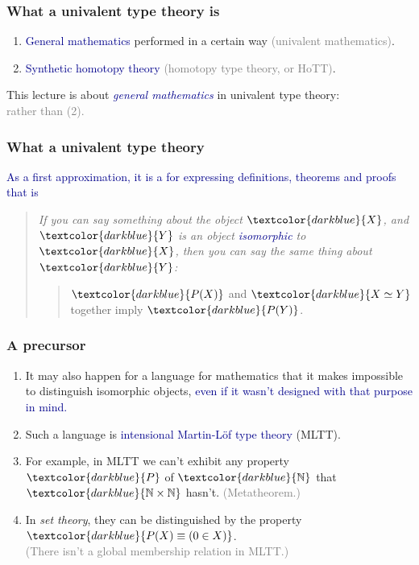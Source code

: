 \documentclass[aspectratio=169]{beamer}
\newcommand{\eqq}{\equiv}
\newcommand{\db}{\textcolor{darkblue}}
\newcommand{\dg}{\textcolor{darkgreen}}
\newcommand{\grey}{\textcolor{grey}}
\newcommand{\m}[1]{$\db{#1}$}
\newcommand{\N}{\mathbb{N}}
\begin{document}
\begin{frame}
  \frametitle{What a univalent type theory is }

  \begin{enumerate}
  \vfill \item \db{General mathematics} performed in a certain way \grey{(univalent mathematics)}.

  \vfill \item \db{Synthetic homotopy theory} \grey{(homotopy type theory, or HoTT)}.
  \end{enumerate}

\vfill

This lecture is about \emph{\db{general mathematics}} in univalent type theory: \\[1ex]
\grey{ rather than (2).}

\end{frame}

\begin{frame}
  \frametitle{What a univalent type theory }

\vfill

  \db{As a first approximation, it is a \framebox{\dg{mathematical language}} for expressing definitions, theorems and proofs that is
  \framebox{\dg{invariant under isomorphism:}}}

\vfill
\begin{quote} \em
If you can say something about the object \m{X}, and \m{Y} is an object \db{isomorphic} to \m{X}, then you can say the same thing about \m{Y}: \\[3ex]
\begin{quote}
\m{P(X)} and \m{X \simeq Y} together imply \m{P(Y)}.
\end{quote}
\end{quote}

\end{frame}


\begin{frame}
  \frametitle{A precursor}

\begin{enumerate}
\vfill \item It may also happen for a language for mathematics that it makes impossible  to distinguish isomorphic objects, \db{even if it wasn't designed with that purpose in mind.}

\vfill \item Such a language is  \db{intensional Martin-L\"of type theory} (MLTT).
\vfill \item For example, in MLTT we can't exhibit any property \m{P} of \m{\N} that \m{\N \times \N} hasn't. \grey{(Metatheorem.)}
\vfill \item In \emph{set theory}, they can be distinguished by the property \m{P(X) \eqq (0 \in X)}. \\[1ex]

\grey{(There isn't a global membership relation in MLTT.)} \\[1ex]

\end{enumerate}

\end{frame}
\end{document}
